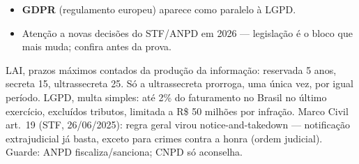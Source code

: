 \begin{itemize}
\item \textbf{GDPR} (regulamento europeu) aparece como paralelo à LGPD.
\item Atenção a novas decisões do STF/ANPD em 2026 --- legislação é o bloco
que mais muda; confira antes da prova.
\end{itemize}

\begin{comosair}
LAI, prazos máximos contados da produção da informação: reservada 5 anos,
secreta 15, ultrassecreta 25. Só a ultrassecreta prorroga, uma única vez,
por igual período. LGPD, multa simples: até 2\% do faturamento no Brasil no
último exercício, excluídos tributos, limitada a R\$ 50 milhões por
infração. Marco Civil art.\ 19 (STF, 26/06/2025): regra geral virou
notice-and-takedown --- notificação extrajudicial já basta, exceto para
crimes contra a honra (ordem judicial). Guarde: ANPD fiscaliza/sanciona;
CNPD só aconselha.
\end{comosair}
